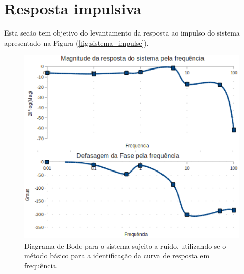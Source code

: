 \section{Resposta impulsiva}
\label{sec:resp_impulse}

Esta secão tem objetivo do levantamento da resposta ao impulso do sistema apresentado
na Figura (\ref{fig:sistema_impulse}).

\begin{figure}[htbp]
	\center
	\includegraphics[width=0.98\columnwidth]{figures/basic_method.eps}
	\caption{Diagrama de Bode para o sistema sujeito a ruido, utilizando-se o método básico para a 
	identificação da curva de resposta em frequência.}
	\label{fig:bode_basic_method}
\end{figure}
